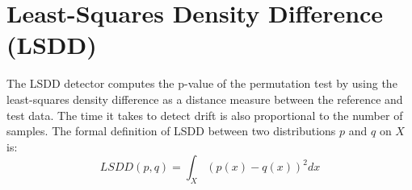 \documentclass[12pt]{report}
\begin{document}
%
%
%
\section{Least-Squares Density Difference (LSDD)}

The LSDD detector computes the p-value of the permutation test by using the least-squares density difference as a distance measure between the reference and test data.
The time it takes to detect drift is also proportional to the number of samples.
The formal definition of LSDD between two distributions \(p\) and \(q\) on \(X\) is:
\[ LSDD(p,q) = \int_X (p(x)-q(x))^2 dx \]
\end{document}

